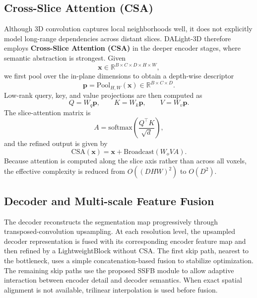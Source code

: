 \documentclass[conference]{IEEEtran}
\begin{document}
\subsection{Cross-Slice Attention (CSA)}
\label{sec:csa}

Although 3D convolution captures local neighborhoods well, it does not explicitly model long-range dependencies across distant slices. DALight-3D therefore employs \textbf{Cross-Slice Attention (CSA)} in the deeper encoder stages, where semantic abstraction is strongest. Given
\begin{equation}
\mathbf{x} \in \mathbb{R}^{B \times C \times D \times H \times W},
\end{equation}
we first pool over the in-plane dimensions to obtain a depth-wise descriptor
\begin{equation}
\mathbf{p} = \mathrm{Pool}_{H,W}(\mathbf{x}) \in \mathbb{R}^{B \times C \times D}.
\end{equation}
Low-rank query, key, and value projections are then computed as
\begin{equation}
Q = W_q \mathbf{p}, \qquad K = W_k \mathbf{p}, \qquad V = W_v \mathbf{p}.
\end{equation}
The slice-attention matrix is
\begin{equation}
A = \mathrm{softmax}\left( \frac{Q^\top K}{\sqrt{d}} \right),
\end{equation}
and the refined output is given by
\begin{equation}
\mathrm{CSA}(\mathbf{x}) = \mathbf{x} + \mathrm{Broadcast}(W_o V A).
\end{equation}
Because attention is computed along the slice axis rather than across all voxels, the effective complexity is reduced from $O((DHW)^2)$ to $O(D^2)$.

\subsection{Decoder and Multi-scale Feature Fusion}
\label{sec:decoder}

The decoder reconstructs the segmentation map progressively through transposed-convolution upsampling. At each resolution level, the upsampled decoder representation is fused with its corresponding encoder feature map and then refined by a LightweightBlock without CSA. The first skip path, nearest to the bottleneck, uses a simple concatenation-based fusion to stabilize optimization. The remaining skip paths use the proposed SSFB module to allow adaptive interaction between encoder detail and decoder semantics. When exact spatial alignment is not available, trilinear interpolation is used before fusion.
\end{document}
